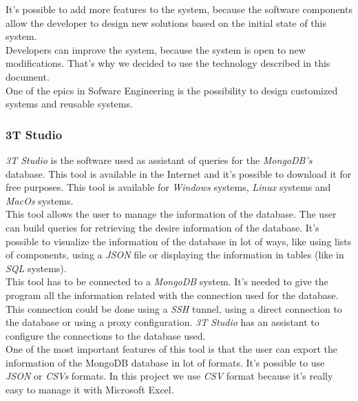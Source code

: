 It's possible to add more features to the system, because the software components allow the developer to design new solutions based on the initial state of this system.\\

Developers can improve the system, because the system is open to new modifications. That's why we decided to use the technology described in this document.\\

One of the epics in Sofware Engineering is the possibility to design customized systems and reusable systems.

\subsubsection{3T Studio}

\textit{3T Studio} is the software used as assistant of queries for the \textit{MongoDB's} database. This tool is available in the Internet and it's possible to download it for free purposes. This tool is available for \textit{Windows} systems, \textit{Linux} systems and \textit{MacOs} systems.\\

This tool allows the user to manage the information of the database. The user can build queries for retrieving the desire information of the database. It's possible to visualize the information of the database in lot of ways, like using lists of components, using a \textit{JSON} file or displaying the information in tables (like in \textit{SQL} systems).\\

This tool has to be connected to a \textit{MongoDB} system. It's needed to give the program all the information related with the connection used for the database. This connection could be done using a \textit{SSH} tunnel, using a direct connection to the database or using a proxy configuration. \textit{3T Studio} has an assistant to configure the connections to the database used.\\

One of the most important features of this tool is that the user can export the information of the MongoDB database in lot of formats. It's possible to use \textit{JSON} or \textit{CSVs} formats. In this project we use \textit{CSV} format because it's really easy to manage it with Microsoft Excel.

